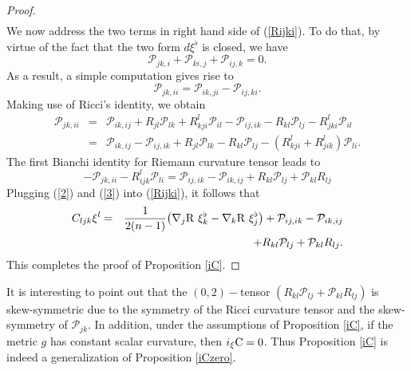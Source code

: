 \documentclass[10pt,leqno,oneside]{amsart}
\begin{document}
{\begin{proof}
\begin{eqnarray}
           \end{eqnarray}
           We now address the two terms in right hand side of (\ref{Rijki}). To do that, by virtue of the fact that the two form $d\xi^\flat$ is closed, we have
           \begin{equation*}
             \mathcal P_{jk,i}+\mathcal P_{ki,j}+\mathcal P_{ij,k}=0.
           \end{equation*}
           As a result, a simple computation gives rise to
           \[\mathcal P_{jk,ii}=\mathcal P_{ik,ji}-\mathcal P_{ij,ki}.\]
           Making use of Ricci's identity, we obtain
           \begin{eqnarray*}
           \mathcal P_{jk,ii}&=&\mathcal P_{ik,ij}+R_{jl}\mathcal P_{lk}+R^l_{kji}\mathcal P_{il}-\mathcal P_{ij,ik}-R_{kl}\mathcal P_{lj}-R^l_{jki}\mathcal P_{il} \\
              &=&\mathcal P_{ik,ij}-\mathcal P_{ij,ik}+R_{jl}\mathcal P_{lk}-R_{kl}\mathcal P_{lj}-(R^l_{kji}+R^l_{jik})\mathcal P_{li}.
           \end{eqnarray*}
           The first Bianchi identity for Riemann curvature tensor leads to
           \begin{equation}\label{3}
             -\mathcal{P}_{jk,ii}-R_{ijk}^l\mathcal{P}_{li}=\mathcal P_{ij,ik}-\mathcal P_{ik,ij}+R_{kl}\mathcal P_{lj}+\mathcal P_{kl}R_{lj}
           \end{equation}
            Plugging (\ref{2}) and (\ref{3}) into (\ref{Rijki}), it follows that
            \begin{eqnarray*}
            C_{ljk}\xi^l&=&\frac{1}{2(n-1)}\big({\nabla_j{\rm{R}} ~\xi_k^{\flat}-\nabla_k\rm{R}} ~\xi_j^{\flat}\big)+\mathcal P_{ij,ik}-\mathcal P_{ik,ij}\\
            &&+R_{kl}\mathcal P_{lj}+\mathcal P_{kl}R_{lj}.
            \end{eqnarray*}
           This completes the proof of Proposition \ref{iC}.
    \end{proof}

           It is interesting to point out that the $(0,2)-$tensor $(R_{kl}\mathcal{P}_{lj}+\mathcal{P}_{kl}R_{lj})$ is skew-symmetric due to the symmetry of the Ricci curvature tensor and the skew-symmetry of $\mathcal{P}_{jk}.$ In addition, under the assumptions of Proposition \ref{iC}, if the metric $g$ has constant scalar curvature, then \(i_{\xi}{\rm{C}}=0\). Thus Proposition \ref{iC} is indeed a generalization of Proposition \ref{iCzero}.

}
\end{document}
